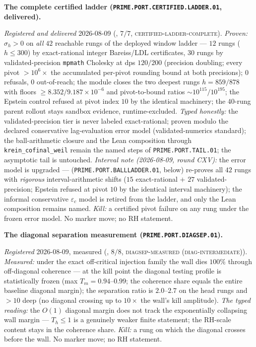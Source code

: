 \par\smallskip\noindent\textbf{The complete certified ladder
(\texttt{PRIME.PORT.CERTIFIED.\allowbreak LADDER.01},
delivered).}
{\sloppy
\emph{Registered and delivered} 2026-08-09
(, $7/7$,
\textsc{certified-ladder-complete}).  \emph{Proven:} $\sigma_h >
0$ on \emph{all} $42$ reachable rungs of the deployed window
ladder --- $12$ rungs ($h \le 300$) by exact-rational integer
Bareiss/LDL certificates, $30$ rungs by validated-precision
\texttt{mpmath} Cholesky at dps $120/200$ (precision doubling;
every pivot $> 10^{6}\times$ the accumulated per-pivot rounding
bound at both precisions); $0$ refusals, $0$ out-of-reach; the
module closes the two deepest rungs $h = 859/878$ with floors
$\ge 8.352/9.187\times10^{-6}$ and pivot-to-bound ratios
${\sim}10^{115}/10^{195}$; the Epstein control refused at pivot
index $10$ by the identical machinery; the $40$-rung parent
rollout stays sandbox evidence, runtime-excluded.  \emph{Typed
honestly:} the validated-precision tier is never labeled
exact-rational; proven modulo the declared conservative
lag-evaluation error model (validated-numerics standard); the
ball-arithmetic closure and the Lean composition through
\texttt{krein\_cofinal\_weil} remain the named steps of
\texttt{PRIME.PORT.TAIL.01}; the asymptotic tail is untouched.
\emph{Interval note (2026-08-09, round CXV):} the error model is
upgraded --- 
(\texttt{PRIME.PORT.BALLLADDER.01}, below) re-proves all $42$
rungs with \emph{rigorous} interval-arithmetic shifts ($15$
exact-rational $+$ $27$ validated-precision; Epstein refused at
pivot $10$ by the identical interval machinery); the informal
conservative $\varepsilon_c$ model is retired from the ladder,
and only the Lean composition remains named.
\emph{Kill:} a certified pivot failure on any rung under the
frozen error model.  No marker move; no RH statement.\par}


\par\smallskip\noindent\textbf{The diagonal separation
measurement (\texttt{PRIME.PORT.\allowbreak DIAGSEP.01}).}
{\sloppy
\emph{Registered} 2026-08-09, measured
(, $8/8$,
\textsc{diagsep-measured (diag-intermediate)}).
\emph{Measured:} under the exact off-critical injection family
the wall dies $100\%$ through off-diagonal coherence --- at the
kill point the diagonal testing profile is statistically frozen
(max $T_m = 0.94$--$0.99$; the coherence share equals the
entire baseline diagonal margin); the separation ratio is
$2.0$--$2.7$ on the head rungs and $> 10$ deep (no diagonal
crossing up to $10\times$ the wall's kill amplitude).
\emph{The typed reading:} the $O(1)$ diagonal margin does not
track the exponentially collapsing wall margin --- $T_h \le 1$
is a genuinely weaker finite statement; the RH-scale content
stays in the coherence share.  \emph{Kill:} a rung on which the
diagonal crosses before the wall.  No marker move; no RH
statement.\par}


